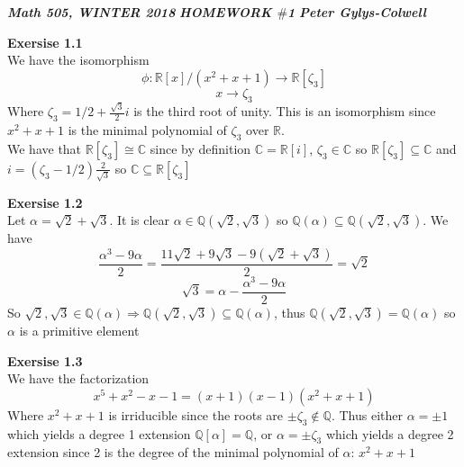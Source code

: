 \documentclass[12pt]{article}
\newenvironment{ques}[1]{\textbf{Exersise #1}\vspace{1 mm}\\ }{\bigskip}
\theoremstyle{definition}
\newcommand{\R}{\mathbb R}
\newcommand{\Q}{\mathbb Q}
\newcommand{\C}{\mathbb C}
\renewcommand{\a}{\alpha}
\begin{document}
\noindent \textit{\textbf{Math 505, WINTER 2018}} \hspace{1.3cm}
\textit{\textbf{HOMEWORK $\#$1}} \hspace{1.3cm} \textit{\textbf{Peter
Gylys-Colwell}} 

\vspace{1cm}

\begin{ques}{1.1}
	We have the  isomorphism
	$$\phi : \R[x]/(x^2 + x + 1) \to \R[\zeta_3]$$
	$$x \to \zeta_3$$
	Where $\zeta_3 = 1/2 + \frac{\sqrt 3 }{ 2}i$ is the third root of unity.
	This is an isomorphism since $x^2 + x + 1$ is the minimal polynomial of
	$\zeta_3$ over $\R$.\\
	We have that $\R[\zeta_3] \cong \C$ since by definition $\C = \R[i]$,
	$\zeta_3 \in \C$ so $\R[\zeta_3] \subseteq \C$ and $i = (\zeta_3 -
	1/2)\frac 2 {\sqrt 3}$ so $\C \subseteq \R[\zeta_3]$
\end{ques}

\begin{ques}{1.2}
	Let $\alpha = \sqrt 2 + \sqrt 3$. It is clear $\alpha \in \Q(\sqrt 2, \sqrt
	3)$ so $\Q(\alpha) \subseteq \Q(\sqrt 2, \sqrt 3)$. We have $$\frac{\a ^3 -
	9\a}{2} = \frac{11\sqrt 2 + 9\sqrt 3 - 9(\sqrt 2 + \sqrt 3)}{2} = \sqrt 2$$
	$$\sqrt 3 = \a - \frac{\a ^3 - 9\a}{2}$$ So $\sqrt 2, \sqrt 3 \in \Q(\a)
	\Rightarrow \Q(\sqrt 2, \sqrt 3) \subseteq \Q(\a)$, thus $\Q(\sqrt 2, \sqrt
	3) = \Q(\a)$ so $\a$ is a primitive element
\end{ques}

\begin{ques}{1.3}
	We have the factorization
	$$x^5 + x^2 - x - 1 = (x + 1)(x - 1)(x^2 + x + 1)$$
	Where $x^2 + x + 1$ is irriducible since the roots are $\pm \zeta_3 \notin
	\Q$. Thus either $\a = \pm 1$ which yields a degree 1 extension $\Q[\a] =
	\Q$, or $\a = \pm \zeta_3$ which yields a degree 2 extension since 2 is the
	degree of the minimal polynomial of $\a$: $x^2 + x + 1$
\end{ques}
\end{document}
